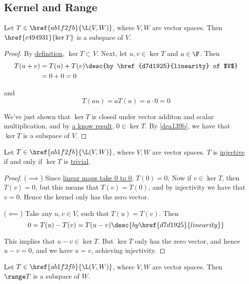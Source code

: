 \subsection{Kernel and Range}\label{a446761}

\label{bdf990d}

Let $T\in\href{ab1f2fb}{\L(V,W)}$, where $V,W$ are vector spaces. Then
$\href{c494931}{\ker T}$ is a subspace of $V$.

\begin{proof}
  By \href{c494931}{definition}, $\ker T\subset V$. Next, let $u,v\in\ker T$ and
  $a\in\F$. Then
  \begin{align*}
    T(u+v) &=T(u)+T(v)\desc{by \href{d7d1925}{linearity} of $V$} \\
           &=0+0=0
  \end{align*}

  and
  $$
    T(au)=aT(u)=a\cdot0=0
  $$

  We've just shown that $\ker T$ is closed under vector additon and scalar
  multiplication, and by \href{c5eb127}{a know result}, $0\in\ker T$. By
  \autoref{dea139b}, we have that $\ker T$ is a subspace of $V$.
\end{proof}

\label{f68db52}

Let $T\in\href{ab1f2fb}{\L(V,W)}$, where $V,W$ are vector spaces. $T$ is
\href{ac44d1d}{injective} if and only if \href{c494931}{$\ker T$} is
\href{f532630}{trivial}.

\begin{proof}
  ($\implies$) Since \href{c5eb127}{linear maps take 0 to 0}, $T(0)=0$. Now if
  $v\in\ker T$, then $T(v)=0$, but this means that $T(v)=T(0)$, and by
  injectivity we have that $v=0$. Hence the kernel only has the zero vector.

  ($\impliedby$) Take any $u,v\in V$, such that $T(u)=T(v)$. Then
  $$
    0=T(u)-T(v)=T(u-v)\desc{by \href{d7d1925}{linearity}}
  $$

  This implies that $u-v\in\ker T$. But $\ker T$ only has the zero vector, and
  hence $u-v=0$, and we have $u=v$, achieving injectivity.
\end{proof}

\label{d0afc28}

Let $T\in\href{ab1f2fb}{\L(V,W)}$, where $V,W$ are vector spaces. Then
\href{a3ef003}{$\range T$} is a subspace of $W$.

